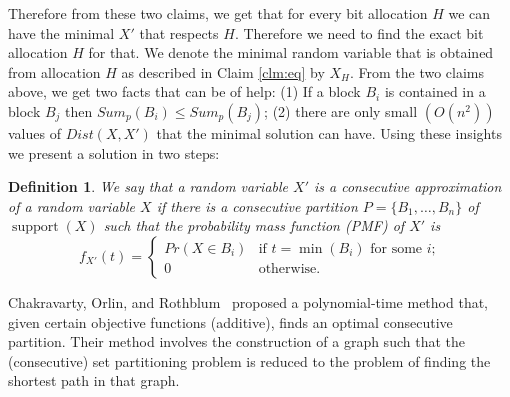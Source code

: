 \documentclass{article}
\newtheorem{definition}{Definition}
\DeclareMathOperator{\support}{support}
\begin{document}
Therefore from these two claims, we get that for every bit allocation $H$ we can have the minimal $X'$ that respects $H$. Therefore we need to find the exact bit allocation $H$ for that. We denote the minimal random variable that is obtained from allocation $H$ as described in Claim \ref{clm:eq} by $X_H$.
From the two claims above, we get two facts that can be of help: (1) If a block $B_i$ is contained in a block $B_j$ then $Sum_p(B_i)\leq Sum_p(B_j)$; (2) there are only small $(O(n^2))$ values of $Dist(X,X')$ that the minimal solution can have. 
Using these insights we present a solution in two steps:


\begin{definition}\label{def:RVpartition}
	We say that a random variable $X'$ is a \emph{consecutive approximation} of a random variable $X$ if there is a consecutive partition $P=\{B_1,\dots,B_n\}$ of $\support(X)$ such that the probability mass function (PMF) of $X'$ is 
	$$f_{X'}(t) = 
	\begin{cases} 
	Pr(X {\in} B_i) &  \text{if $t = \min(B_i)$ for some $i$;}\\
	0          &  \text{otherwise.}
	\end{cases}$$
\end{definition}

Chakravarty, Orlin, and Rothblum~\cite{chakravarty1982partitioning} proposed a polynomial-time method that, given certain objective functions (additive), finds an optimal consecutive partition. Their method involves the construction of a graph such that the (consecutive) set partitioning problem is reduced to the problem of finding the shortest path in that graph.
\end{document}
